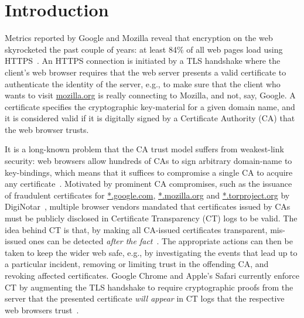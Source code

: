 \section{Introduction} \label{sec:introduction}
Metrics reported by Google and Mozilla reveal that encryption on the web
skyrocketed the past couple of years: at least 84\% of all web pages load using
HTTPS~\cite{google-metrics,mozilla-metrics}. An HTTPS connection is initiated by
a TLS handshake where the client's web browser requires that the web server
presents a valid certificate to authenticate the identity of the server, e.g.,
to make sure that the client who wants to visit \url{mozilla.org} is really
connecting to Mozilla, and not, say, Google. A certificate specifies the
cryptographic key-material for a given domain name, and it is considered valid
if it is digitally signed by a Certificate Authority (CA) that the web browser
trusts.

It is a long-known problem that the CA trust model suffers from
weakest-link security:
	web browsers allow hundreds of CAs to sign arbitrary domain-name to
		key-bindings,
	which means that it suffices to compromise a single CA to acquire any
		certificate~\cite{ca-ecosystem,https-sok}.
Motivated by prominent CA compromises, such as the issuance of fraudulent
certificates for
	\url{*.google.com},
	\url{*.mozilla.org} and
	\url{*.torproject.org}
by DigiNotar~\cite{diginotar}, multiple browser vendors mandated
that certificates issued by CAs must be publicly disclosed in Certificate
Transparency (CT) logs to be valid.  The idea behind CT is that, by making all
CA-issued certificates transparent, mis-issued ones can be detected
\emph{after the fact}~\cite{ct/a,ct,ct/bis}.  The appropriate actions can then
be taken to keep the wider web safe, e.g., by
	investigating the events that lead up to a particular incident,
	removing or limiting trust in the offending CA, and
	revoking affected certificates.
Google Chrome and Apple's Safari currently enforce CT by augmenting the TLS
handshake to require cryptographic proofs from the server that the presented
certificate \emph{will appear} in CT logs that the respective web browsers
trust~\cite{chrome-policy,safari-policy}.

